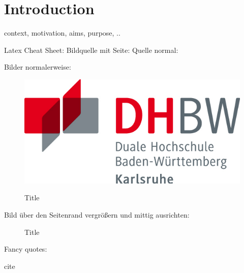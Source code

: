 \chapter{Introduction}
\label{ch:einleitung}

context, motivation, aims, purpose, ..

Latex Cheat Sheet:
Bildquelle mit Seite: \cite[S.1-42]{bibkey}
Quelle normal: \cite{freiknechtBigDataPraxis2018}

Bilder normalerweise:
\begin{figure}[htbp] 
	\centering
	\includegraphics[width=1.0\textwidth]{logos/dhbwLogo.png}
	\caption{Title}
	\cite{bibkey}
	\label{fig:label01}
\end{figure}
Bild über den Seitenrand vergrößern und mittig ausrichten:
\begin{figure}[htbp] 
	\centering
	\caption{Title}
	\cite{bibkey}
	\label{fig:labelName}
\end{figure}

Fancy quotes:
\begin{fquote}
	cite
\end{fquote}

